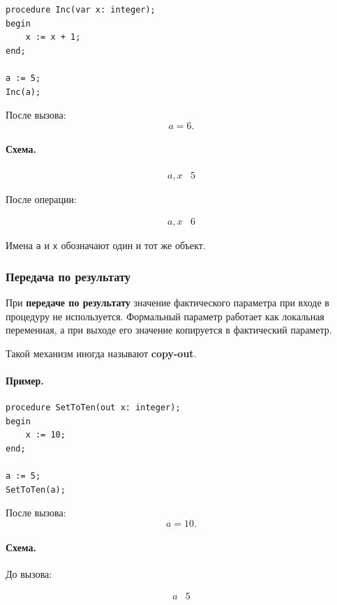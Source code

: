 \documentclass[12pt,a4paper]{article}
\begin{document}
\begin{verbatim}
procedure Inc(var x: integer);
begin
    x := x + 1;
end;

a := 5;
Inc(a);
\end{verbatim}

После вызова:
\[
    a = 6.
\]

\paragraph{Схема.}

\[
\begin{array}{c|c}
a, x & 5
\end{array}
\]

После операции:

\[
\begin{array}{c|c}
a, x & 6
\end{array}
\]

Имена \texttt{a} и \texttt{x} обозначают один и тот же объект.

\subsubsection{Передача по результату}

При \textbf{передаче по результату} значение фактического параметра при входе в процедуру не используется. Формальный параметр работает как локальная переменная, а при выходе его значение копируется в фактический параметр.

Такой механизм иногда называют \textbf{copy-out}.

\paragraph{Пример.}

\begin{verbatim}
procedure SetToTen(out x: integer);
begin
    x := 10;
end;

a := 5;
SetToTen(a);
\end{verbatim}

После вызова:
\[
    a = 10.
\]

\paragraph{Схема.}

До вызова:

\[
\begin{array}{c|c}
a & 5
\end{array}
\]
\end{document}
